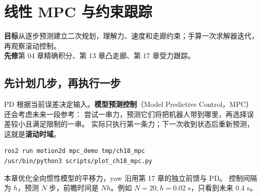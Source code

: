 \chapter{线性 MPC 与约束跟踪}
\begin{notebox}
\textbf{目标}\quad 从逐步预测建立二次规划，理解力、速度和走廊约束；手算一次求解器迭代，再观察滚动控制。\\
\textbf{先修}\quad 第 04 章精确积分、第 13 章凸走廊、第 17 章受力跟踪。
\end{notebox}
\section{先计划几步，再执行一步}
PD 根据当前误差决定输入。\textbf{模型预测控制}（Model Predictive Control，MPC）还会考虑未来一段参考：
尝试一串力，预测它们将把机器人带到哪里，再选择误差较小且满足限制的一串。
实际只执行第一条力；下一次收到状态后重新预测，这就是\textbf{滚动时域}。
\begin{lstlisting}[language=bash,numbers=none]
ros2 run motion2d mpc_demo tmp/ch18_mpc
/usr/bin/python3 scripts/plot_ch18_mpc.py
\end{lstlisting}
本章优化全向惯性模型的平移力，yaw 沿用第 17 章的独立前馈与 PD。
控制间隔为 $h$，预测 $N$ 步，前瞻时间是 $Nh$。例如 $N=20,h=0.02$ s，只看到未来 0.4 s。

\begin{center}\begin{minipage}{\linewidth}\makeatletter{}\makeatother
\centering
{}
\caption{三步预测的滚动过程。下次预测从实际测量状态出发，原预测的后两条力用于提供求解初值。}
\end{minipage}\end{center}

